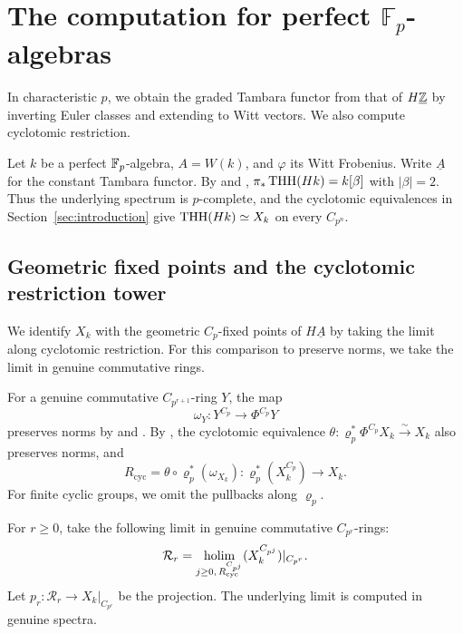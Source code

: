 \section{The computation for perfect \texorpdfstring{$\mathbb F_p$}{Fp}-algebras}
\label{app:characteristic-p}
In characteristic $p$, we obtain the graded Tambara functor from that
of $H\underline{\mathbb Z}$ by inverting Euler classes and extending to Witt
vectors. We also compute cyclotomic restriction.

Let $k$ be a perfect $\mathbb F_p$-algebra, $A=W(k)$, and $\varphi$ its Witt
Frobenius.
Write $\underline A$ for the constant Tambara functor.
By \cite[Proposition~2.1]{KrauseNikolaus} and \cite{Bokstedt},
$\pi_*\operatorname{THH}(Hk)=k[\beta]$ with $|\beta|=2$.
Thus the underlying spectrum is $p$-complete, and the cyclotomic equivalences
in Section~\ref{sec:introduction} give $\operatorname{THH}(Hk)\simeq X_k$ on every $C_{p^n}$.

\subsection{Geometric fixed points and the cyclotomic restriction tower}

We identify $X_k$ with the geometric $C_p$-fixed points of
$H\underline A$ by taking the limit along cyclotomic restriction.
For this comparison to preserve norms, we take the limit in genuine
commutative rings.

For a genuine commutative $C_{p^{r+1}}$-ring $Y$, the map
\begin{equation*}
\omega_Y:Y^{C_p}\longrightarrow\Phi^{C_p}Y
\end{equation*}
preserves norms by
\cite[Theorem~6.1 and Corollary~6.5]{BHNorm} and
\cite[Proposition~2.19 and Theorem~2.35]{NormTHH}.
By \cite[Proposition~1.2, Theorem~2.36 and
Theorems~4.6--4.7]{NormTHH}, the cyclotomic equivalence
$\theta:\varrho_p^*\Phi^{C_p}X_k\xrightarrow{\sim}X_k$
also preserves norms, and
\[
R_{\mathrm{cyc}}=\theta\circ\varrho_p^*(\omega_{X_k}):
\varrho_p^*(X_k^{C_p})\longrightarrow X_k.
\]
For finite cyclic groups, we omit the pullbacks along $\varrho_p$.

\begin{definition}
For $r\ge0$, take the following limit in genuine commutative
$C_{p^r}$-rings:
\[
\mathcal R_r=\operatorname*{holim}_{j\ge0,\,R_{\mathrm{cyc}}^{C_{p^j}}}
(X_k^{C_{p^j}})|_{C_{p^r}}.
\]
Let $p_r:\mathcal R_r\to X_k|_{C_{p^r}}$ be the projection.
The underlying limit is computed in genuine spectra.
\end{definition}

